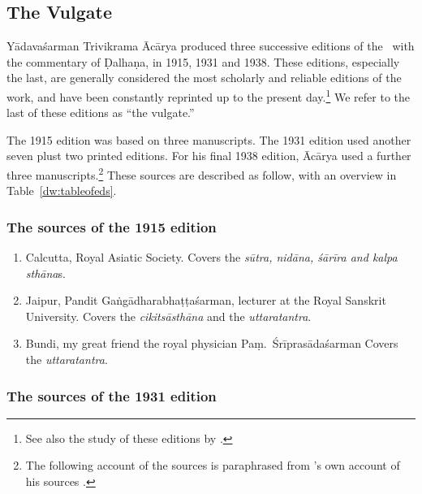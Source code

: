 \subsection{The Vulgate} 

Yādavaśarman Trivikrama Ācārya produced three successive editions of the
\SS\ with the commentary of Ḍalhaṇa, in 1915, 1931 and 1938.  These
editions, especially the last, are generally considered the most 
scholarly
and reliable editions of the work, and have been constantly reprinted up
to the present day.\footnote{See also the study of these editions by \textcites[\S 
1.2]{kleb-2021b}[143--144]{wuja-2013}.}  We refer to the last of these editions 
as “the vulgate.”

The 1915 edition was based on three manuscripts.  The 1931 edition used another
seven plust two printed editions.  For his final 1938 edition, Ācārya used a
further three manuscripts.\footnote{The following account of the sources is
paraphrased from \citeauthor{vulgate}'s own account of his sources
\citep[22]{vulgate}.}  These sources are described as follow, with an
overview in Table~\ref{dw:tableofeds}.

\subsubsection{The sources of the 1915 edition}

\begin{enumerate}
    \item[1] Calcutta, Royal Asiatic Society.  Covers the \emph{sūtra, nidāna, śārīra and 
        kalpa sthāna}s.  
    
    \item [2] Jaipur, Pandit Gaṅgādharabhaṭṭaśarman, lecturer at the Royal 
    Sanskrit University.  Covers the \emph{cikitsāsthāna} and the \emph{uttaratantra}.
    
    \item [3]  Bundi, my great friend the royal physician Paṃ.\ Śrīprasādaśarman  
    Covers the \emph{uttaratantra}.
\end{enumerate}

\subsubsection{The sources of the 1931 edition}

